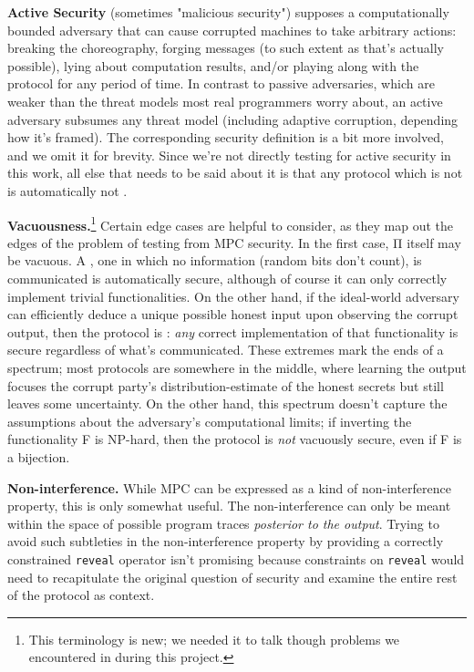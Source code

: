 \documentclass[compsoc, conference, a4paper, 10pt, times]{IEEEtran}
\renewcommand{\paragraph}[1]{\vspace*{2pt}\noindent\textbf{#1}}
\begin{document}
\paragraph{Active Security}
(sometimes "malicious security")
supposes a computationally bounded adversary that can cause corrupted machines to take arbitrary actions:
breaking the choreography,
forging messages (to such extent as that's actually possible),
lying about computation results,
and/or playing along with the protocol for any period of time.
In contrast to passive adversaries, which are weaker than the threat models most real programmers worry about,
an active adversary subsumes any threat model (including adaptive corruption, depending how it's framed).
The corresponding security definition is a bit more involved, and we omit it for brevity.
Since we're not directly testing for active security in this work,
all else that needs to be said about it is that
any protocol which is not  is automatically not .

\paragraph{Vacuousness.}\footnote{
    This terminology is new; we needed it to talk though problems we encountered in during this project.
}
Certain edge cases are helpful to consider, as they map out the edges of the problem of testing from MPC security.
In the first case, Π itself may be vacuous.
A , one in which no information (random bits don't count), is communicated is automatically secure,
although of course it can only correctly implement trivial functionalities.
On the other hand, if the ideal-world adversary can efficiently deduce a unique possible honest input upon observing the corrupt output,
then the protocol is : \textit{any} correct implementation of that functionality is secure regardless of what's communicated.
These extremes mark the ends of a spectrum; most protocols are somewhere in the middle,
where learning the output focuses the corrupt party's distribution-estimate of the honest secrets but still leaves some uncertainty.
On the other hand, this spectrum doesn't capture the assumptions about the adversary's computational limits;
if inverting the functionality F is NP-hard, then the protocol is \textit{not} vacuously secure, even if F is a bijection.

\paragraph{Non-interference.}
While MPC can be expressed as a kind of non-interference property, this is only somewhat useful.
The non-interference can only be meant within the space of possible program traces \textit{posterior to the output}.
Trying to avoid such subtleties in the non-interference property by providing a correctly constrained \texttt{reveal} operator
isn't promising because constraints on \texttt{reveal} would need to recapitulate the original question of security
and examine the entire rest of the protocol as context.
\end{document}
